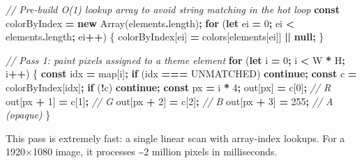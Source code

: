 \documentclass[
  11pt,
  oneside]{report}
\newenvironment{Shaded}{\begin{snugshade}}{\end{snugshade}}
\newcommand{\AttributeTok}[1]{\textcolor[rgb]{0.13,0.29,0.53}{#1}}
\newcommand{\BuiltInTok}[1]{#1}
\newcommand{\CommentTok}[1]{\textcolor[rgb]{0.56,0.35,0.01}{\textit{#1}}}
\newcommand{\ControlFlowTok}[1]{\textcolor[rgb]{0.13,0.29,0.53}{\textbf{#1}}}
\newcommand{\DecValTok}[1]{\textcolor[rgb]{0.00,0.00,0.81}{#1}}
\newcommand{\KeywordTok}[1]{\textcolor[rgb]{0.13,0.29,0.53}{\textbf{#1}}}
\newcommand{\NormalTok}[1]{#1}
\newcommand{\OperatorTok}[1]{\textcolor[rgb]{0.81,0.36,0.00}{\textbf{#1}}}
\begin{document}
\begin{Shaded}
\begin{Highlighting}[]
\CommentTok{// Pre{-}build O(1) lookup array to avoid string matching in the hot loop}
\KeywordTok{const}\NormalTok{ colorByIndex }\OperatorTok{=} \KeywordTok{new} \BuiltInTok{Array}\NormalTok{(elements}\OperatorTok{.}\AttributeTok{length}\NormalTok{)}\OperatorTok{;}
\ControlFlowTok{for}\NormalTok{ (}\KeywordTok{let}\NormalTok{ ei }\OperatorTok{=} \DecValTok{0}\OperatorTok{;}\NormalTok{ ei }\OperatorTok{\textless{}}\NormalTok{ elements}\OperatorTok{.}\AttributeTok{length}\OperatorTok{;}\NormalTok{ ei}\OperatorTok{++}\NormalTok{) \{}
\NormalTok{  colorByIndex[ei] }\OperatorTok{=}\NormalTok{ colors[elements[ei]] }\OperatorTok{||} \KeywordTok{null}\OperatorTok{;}
\NormalTok{\}}

\CommentTok{// Pass 1: paint pixels assigned to a theme element}
\ControlFlowTok{for}\NormalTok{ (}\KeywordTok{let}\NormalTok{ i }\OperatorTok{=} \DecValTok{0}\OperatorTok{;}\NormalTok{ i }\OperatorTok{\textless{}}\NormalTok{ W }\OperatorTok{*}\NormalTok{ H}\OperatorTok{;}\NormalTok{ i}\OperatorTok{++}\NormalTok{) \{}
  \KeywordTok{const}\NormalTok{ idx }\OperatorTok{=}\NormalTok{ map[i]}\OperatorTok{;}
  \ControlFlowTok{if}\NormalTok{ (idx }\OperatorTok{===}\NormalTok{ UNMATCHED) }\ControlFlowTok{continue}\OperatorTok{;}
  \KeywordTok{const}\NormalTok{ c }\OperatorTok{=}\NormalTok{ colorByIndex[idx]}\OperatorTok{;}
  \ControlFlowTok{if}\NormalTok{ (}\OperatorTok{!}\NormalTok{c) }\ControlFlowTok{continue}\OperatorTok{;}
  \KeywordTok{const}\NormalTok{ px }\OperatorTok{=}\NormalTok{ i }\OperatorTok{*} \DecValTok{4}\OperatorTok{;}
\NormalTok{  out[px]     }\OperatorTok{=}\NormalTok{ c[}\DecValTok{0}\NormalTok{]}\OperatorTok{;}   \CommentTok{// R}
\NormalTok{  out[px }\OperatorTok{+} \DecValTok{1}\NormalTok{] }\OperatorTok{=}\NormalTok{ c[}\DecValTok{1}\NormalTok{]}\OperatorTok{;}   \CommentTok{// G}
\NormalTok{  out[px }\OperatorTok{+} \DecValTok{2}\NormalTok{] }\OperatorTok{=}\NormalTok{ c[}\DecValTok{2}\NormalTok{]}\OperatorTok{;}   \CommentTok{// B}
\NormalTok{  out[px }\OperatorTok{+} \DecValTok{3}\NormalTok{] }\OperatorTok{=} \DecValTok{255}\OperatorTok{;}    \CommentTok{// A (opaque)}
\NormalTok{\}}
\end{Highlighting}
\end{Shaded}

This pass is extremely fast: a single linear scan with array-index
lookups. For a 1920×1080 image, it processes \textasciitilde2 million
pixels in milliseconds.
\end{document}
